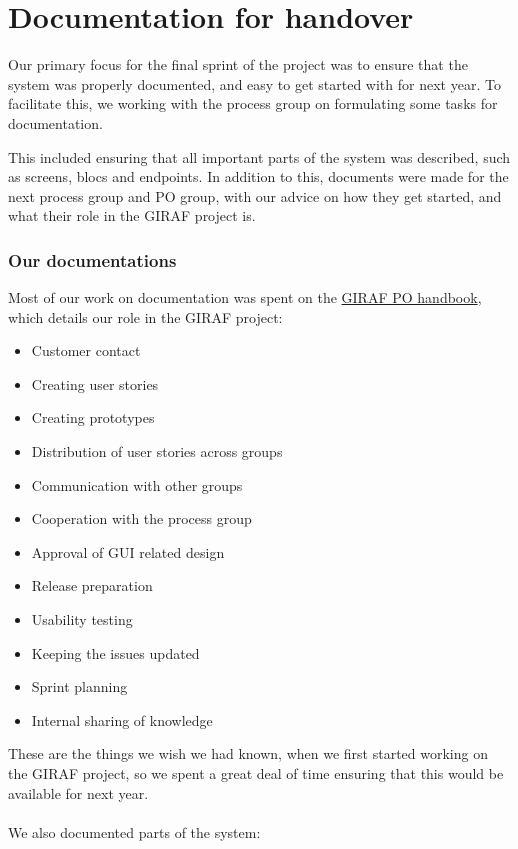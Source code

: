 \section{Documentation for handover}
Our primary focus for the final sprint of the project was to ensure that the system was properly documented, and easy to get started with for next year.
To facilitate this, we working with the process group on formulating some tasks for documentation.

This included ensuring that all important parts of the system was described, such as screens, blocs and endpoints.
In addition to this, documents were made for the next process group and PO group, with our advice on how they get started, and what their role in the GIRAF project is.

\subsubsection{Our documentations}
Most of our work on documentation was spent on the \href{https://github.com/aau-giraf/wiki/blob/master/advice_for_future_giraf/PO_advice.md}{GIRAF PO handbook}, which details our role in the GIRAF project:

\begin{itemize}
    \item Customer contact
    \item Creating user stories 
    \item Creating prototypes
    \item Distribution of user stories across groups
    \item Communication with other groups
    \item Cooperation with the process group
    \item Approval of GUI related design
    \item Release preparation
    \item Usability testing
    \item Keeping the issues updated
    \item Sprint planning
    \item Internal sharing of knowledge
\end{itemize}

These are the things we wish we had known, when we first started working on the GIRAF project, so we spent a great deal of time ensuring that this would be available for next year.
\\\\
We also documented parts of the system:

